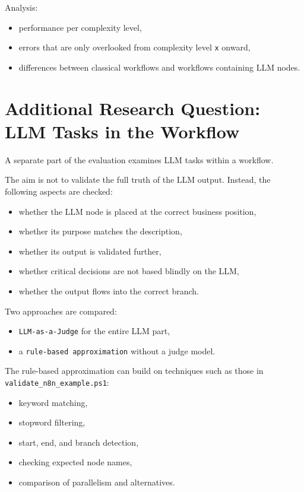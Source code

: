 \documentclass[12pt,a4paper]{article}
\begin{document}
Analysis:

\begin{itemize}
  \item performance per complexity level,
  \item errors that are only overlooked from complexity level \texttt{x} onward,
  \item differences between classical workflows and workflows containing LLM nodes.
\end{itemize}

\section{Additional Research Question: LLM Tasks in the Workflow}

A separate part of the evaluation examines LLM tasks within a workflow.

The aim is not to validate the full truth of the LLM output. Instead, the following aspects are checked:

\begin{itemize}
  \item whether the LLM node is placed at the correct business position,
  \item whether its purpose matches the description,
  \item whether its output is validated further,
  \item whether critical decisions are not based blindly on the LLM,
  \item whether the output flows into the correct branch.
\end{itemize}

Two approaches are compared:

\begin{itemize}
  \item \texttt{LLM-as-a-Judge} for the entire LLM part,
  \item a \texttt{rule-based approximation} without a judge model.
\end{itemize}

The rule-based approximation can build on techniques such as those in \texttt{validate\_n8n\_example.ps1}:

\begin{itemize}
  \item keyword matching,
  \item stopword filtering,
  \item start, end, and branch detection,
  \item checking expected node names,
  \item comparison of parallelism and alternatives.
\end{itemize}
\end{document}
